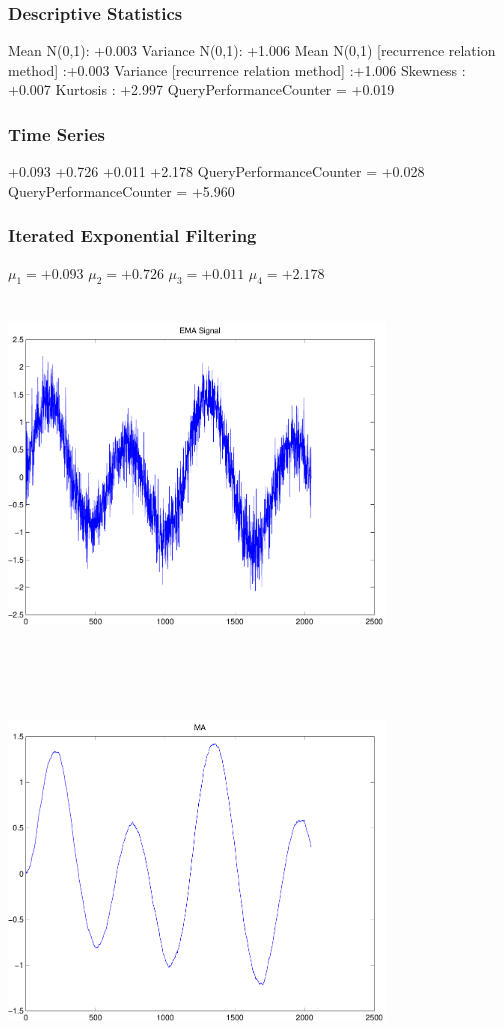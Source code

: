 \documentclass[9pt]{article}
\theoremstyle{plain}
\theoremstyle{definition}
\theoremstyle{remark}
\numberwithin{equation}{section}
\begin{document}
\subsubsection{Descriptive Statistics}
Mean N(0,1): +0.003
Variance N(0,1): +1.006
Mean N(0,1) [recurrence relation method] :+0.003
Variance [recurrence relation method] :+1.006
Skewness : +0.007
Kurtosis : +2.997
QueryPerformanceCounter  =  +0.019
\subsubsection{Time Series }
+0.093
+0.726
+0.011
+2.178
QueryPerformanceCounter  =  +0.028
QueryPerformanceCounter  =  +5.960
\subsubsection{Iterated Exponential Filtering }
$\mu_1 =+0.093$
$\mu_2 =+0.726$
$\mu_3 =+0.011$
$\mu_4 =+2.178$
\includegraphics[width=10.0cm,height=10.0cm]{EMA_signal.pdf}

\includegraphics[width=10.0cm,height=10.0cm]{MA.pdf}
\end{document}
